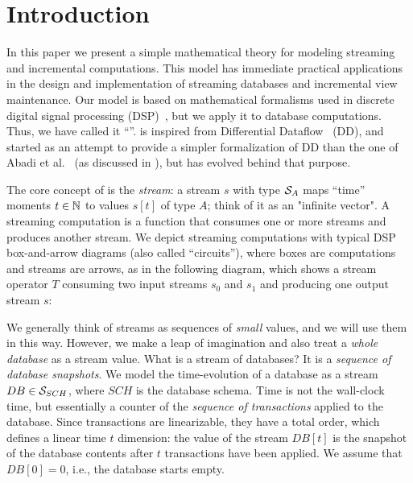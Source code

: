 \section{Introduction}\label{sec:ntro}

In this paper we present a simple mathematical theory for modeling
streaming and incremental computations.  This model has immediate
practical applications in the design and implementation of streaming databases
and incremental view maintenance.  Our model is based on mathematical formalisms
used in discrete digital signal processing (DSP)~\cite{rabiner-book75},
but we apply it to database computations.
Thus, we have called it ``\dbsp''.  \dbsp is inspired from Differential
Dataflow~\cite{mcsherry-cidr13} (DD), and started as an attempt to provide a simpler
formalization of DD than the one of Abadi et al.~\cite{abadi-fossacs15}
(as discussed in ), but has evolved behind that purpose.

The core concept of \dbsp is the \emph{stream}: a stream $s$ with type
$\mathcal{S}_{A}$ maps ``time'' moments $t\in\mathbb{N}$
to values $s[t]$ of type $A$; think of it as an "infinite vector".
A streaming computation is a function that
consumes one or more streams and produces another stream.  We depict
streaming computations with typical DSP box-and-arrow diagrams (also called ``circuits''),
where boxes are computations and streams are arrows, as in the following diagram,
which shows a stream operator $T$ consuming two input streams $s_0$ and $s_1$
and producing one output stream $s$:

\begin{center}
\vspace{-.2cm}
\end{center}

We generally think of streams as sequences of \emph{small} values,
and we will use them in this way.
However, we make a leap of imagination and also treat a \emph{whole database} as a stream value.
What is a stream of databases?  It is a \emph{sequence of database
snapshots}.  We model the time-evolution of a database as a
stream $DB \in \mathcal{S}_{SCH}$, where $SCH$ is the database schema.
Time is not the wall-clock time, but essentially a counter
of the \emph{sequence of transactions} applied to the database.
Since transactions are linearizable,
they have a total order, which defines a linear time $t$ dimension:
the value of the stream $DB[t]$ is the snapshot of the
database contents after $t$ transactions have been applied.  We assume that $DB[0] = 0$, i.e., the database starts empty.

